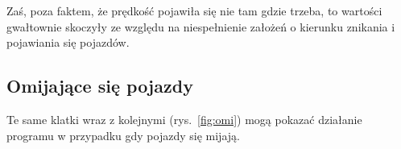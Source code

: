 \documentclass[11pt, a4paper]{article}
\begin{document}
Zaś, poza faktem, że prędkość pojawiła się nie tam gdzie trzeba, to wartości gwałtownie skoczyły ze względu na niespełnienie założeń o kierunku znikania i pojawiania się pojazdów.

\subsection*{Omijające się pojazdy}

Te same klatki wraz z kolejnymi (rys.~\ref{fig:omi}) mogą pokazać działanie programu w przypadku gdy pojazdy się mijają.
\begin{figure}[htbp!]
	\centering
	
	\hfill%
\end{figure}
\end{document}
